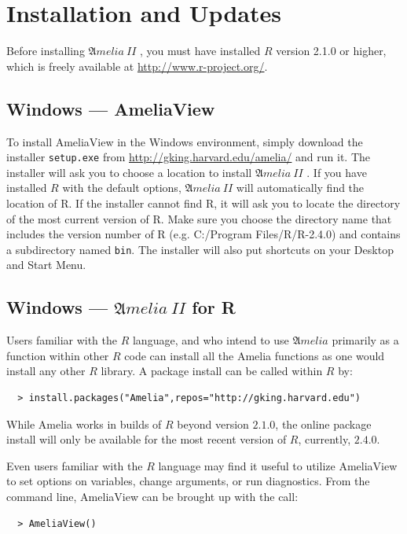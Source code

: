 \documentclass[12pt,titlepage]{article}
\newcommand{\Amelia}{\ensuremath{\mathfrak Amelia} }
\newcommand{\AmeliaII}{\ensuremath{\mathfrak Amelia~II} }
\begin{document}
\section{Installation and Updates}
\label{sec:install}

Before installing \AmeliaII, you must have installed $R$ version 2.1.0
or higher, which is freely available at
\url{http://www.r-project.org/}.
\subsection{Windows --- AmeliaView}
\label{sec:win-install}
To install AmeliaView in the Windows environment, simply download the
installer \texttt{setup.exe} from
\url{http://gking.harvard.edu/amelia/} and run it.  The installer will
ask you to choose a location to install \AmeliaII.  If you have
installed $R$ with the default options, \AmeliaII will automatically
find the location of R.  If the installer cannot find R, it will ask
you to locate the directory of the most current version of R.  Make
sure you choose the directory name that includes the version number of
R (e.g. C:/Program Files/R/R-2.4.0) and contains a subdirectory named
\texttt{bin}.  The installer will also put shortcuts on your Desktop
and Start Menu.

\subsection{Windows --- \AmeliaII for R}

Users familiar with the $R$ language, and who intend to use \Amelia
primarily as a function within other $R$ code can install all the
Amelia functions as one would install any other $R$ library.  A
package install can be called within $R$ by:
  \begin{verbatim}
  > install.packages("Amelia",repos="http://gking.harvard.edu")
  \end{verbatim}
While Amelia works in builds of $R$ beyond version $2.1.0$, the online package install will only be available for the most recent version of $R$, currently, $2.4.0$. 


Even users familiar with the $R$ language may find it useful to
utilize AmeliaView to set options on variables, change arguments, or
run diagnostics.  From the command line, AmeliaView can be brought up
with the call:
  \begin{verbatim}
  > AmeliaView()
  \end{verbatim}
\end{document}
